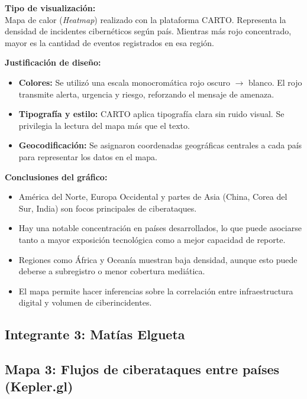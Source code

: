 \documentclass[12pt, a4paper]{article}
\begin{document}
\vspace{0.5em}
\textbf{Tipo de visualización:} \\
Mapa de calor (\textit{Heatmap}) realizado con la plataforma CARTO. Representa la densidad de incidentes cibernéticos según país. Mientras más rojo concentrado, mayor es la cantidad de eventos registrados en esa región.

\vspace{0.5em}
\textbf{Justificación de diseño:} \\
\begin{itemize}
    \item \textbf{Colores:} Se utilizó una escala monocromática rojo oscuro $\rightarrow$ blanco. El rojo transmite alerta, urgencia y riesgo, reforzando el mensaje de amenaza.
    \item \textbf{Tipografía y estilo:} CARTO aplica tipografía clara sin ruido visual. Se privilegia la lectura del mapa más que el texto.
    \item \textbf{Geocodificación:} Se asignaron coordenadas geográficas centrales a cada país para representar los datos en el mapa.
\end{itemize}

\vspace{0.5em}
\textbf{Conclusiones del gráfico:} \\
\begin{itemize}
    \item América del Norte, Europa Occidental y partes de Asia (China, Corea del Sur, India) son focos principales de ciberataques.
    \item Hay una notable concentración en países desarrollados, lo que puede asociarse tanto a mayor exposición tecnológica como a mejor capacidad de reporte.
    \item Regiones como África y Oceanía muestran baja densidad, aunque esto puede deberse a subregistro o menor cobertura mediática.
    \item El mapa permite hacer inferencias sobre la correlación entre infraestructura digital y volumen de ciberincidentes.
\end{itemize}

\newpage
\subsection*{Integrante 3: Matías Elgueta}

\subsection*{Mapa 3: Flujos de ciberataques entre países (Kepler.gl)}
\end{document}
